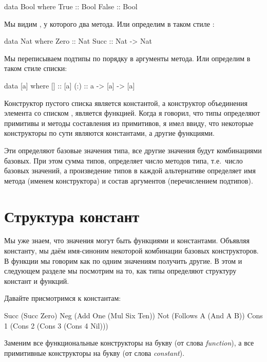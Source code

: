 \begin{code}
data Bool where
    True  :: Bool
    False :: Bool
\end{code}

Мы видим  , у которого два метода.
Или определим в таком стиле :

\begin{code}
data Nat where
    Zero  :: Nat
    Succ  :: Nat -> Nat
\end{code}

Мы переписываем подтипы по порядку в аргументы метода.
Или определим в таком стиле списки:

\begin{code}
data [a] where
    []   :: [a]
    (:)  :: a -> [a] -> [a] 
\end{code}

Конструктор пустого списка \In{[]} является константой,
а конструктор объединения элемента со списком \In{(:)}, является
функцией. Когда я говорил, что типы определяют примитивы
и методы составления из примитивов, я имел ввиду, что
некоторые конструкторы по сути являются константами, а 
другие функциями.

Эти  определяют базовые значения типа, 
все другие значения будут комбинациями базовых. 
При этом сумма типов, определяет число методов 
типа, т.е.~число базовых значений, а произведение типов
в каждой альтернативе определяет имя метода (именем конструктора) 
и состав аргументов (перечислением подтипов).

\section{Структура констант}

Мы уже знаем, что значения могут быть функциями и константами.
Объявляя константу, мы даём имя-синоним некоторой комбинации 
базовых конструкторов. В функции мы говорим как по одним 
значениям получить другие. В этом и следующем разделе мы
посмотрим на то, как типы определяют структуру констант и  функций.

Давайте присмотримся к константам:

\begin{code}
Succ (Succ Zero)
Neg (Add One (Mul Six Ten))
Not (Follows A (And A B))
Cons 1 (Cons 2 (Cons 3 (Cons 4 Nil)))
\end{code}

Заменим все функциональные конструкторы на букву 
(от слова \emph{function}), а все примитивные конструкторы на
букву  (от слова \emph{constant}). 

